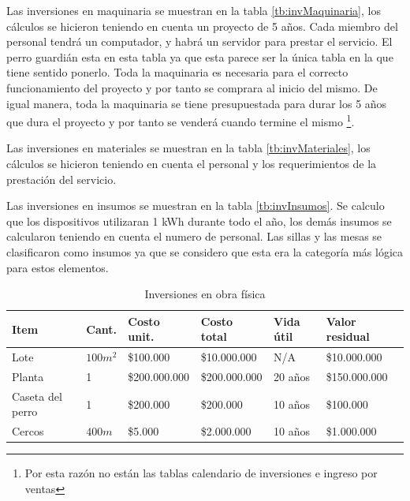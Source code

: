 \documentclass[a4paper, 12pt, oneside]{article}
\begin{document}
	Las inversiones en maquinaria se muestran en la tabla \ref{tb:invMaquinaria}, los cálculos se hicieron teniendo en cuenta un proyecto de 5 años. Cada miembro del personal tendrá un computador, y habrá un servidor para prestar el servicio. El perro guardián esta en esta tabla ya que esta parece ser la única tabla en la que tiene sentido ponerlo. Toda la maquinaria es necesaria para el correcto funcionamiento del proyecto y por tanto se comprara al inicio del mismo. De igual manera, toda la maquinaria se tiene presupuestada para durar los 5 años que dura el proyecto y por tanto se venderá cuando termine el mismo \footnote{Por esta razón no están las tablas calendario de inversiones e ingreso por ventas}.
	
	Las inversiones en materiales se muestran en la tabla \ref{tb:invMateriales}, los cálculos se hicieron teniendo en cuenta el personal y los requerimientos de la prestación del servicio.

	Las inversiones en insumos se muestran en la tabla \ref{tb:invInsumos}. Se calculo que los dispositivos utilizaran 1 kWh durante todo el año, los demás insumos se calcularon teniendo en cuenta el numero de personal. Las sillas y las mesas se clasificaron como insumos ya que se considero que esta era la categoría más lógica para estos elementos.
	
	\begin{table}
		\caption{Inversiones en obra física}
		\begin{tabular}{ | p{3cm} | p{1cm} | p{2.5cm} | p{2.5cm} | p{1cm} | p{2.2cm} | }
		\hline
		Item & Cant. & Costo unit. & Costo total & Vida útil & Valor residual \\
		\hline					
		Lote & $100m^2$ & \$100.000 & \$10.000.000 & N/A & \$10.000.000 \\
		\hline					
		Planta & 1 & \$200.000.000 & \$200.000.000 & 20 años & \$150.000.000 \\
		\hline
		Caseta del perro & 1 & \$200.000 & \$200.000 & 10 años & \$100.000 \\ 
		\hline
		Cercos & $400m$ & \$5.000 & \$2.000.000 & 10 años & \$1.000.000 \\
		\hline
		\end{tabular}
		\label{tb:invFisica}
	\end{table}
\end{document}
